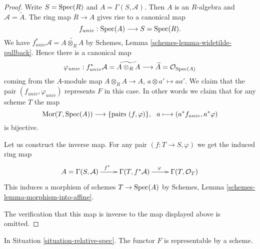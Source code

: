 \begin{proof}
Write $S = \mathop{\rm Spec}(R)$ and $A = \Gamma(S, \mathcal{A})$.
Then $A$ is an $R$-algebra and $\mathcal{A} = \widetilde A$.
The ring map $R \to A$ gives rise to a canonical map
$$
f_{univ} : \mathop{\rm Spec}(A)
\longrightarrow
S = \mathop{\rm Spec}(R).
$$
We have
$f_{univ}^*\mathcal{A} =  \widetilde{A \otimes_R A}$
by Schemes, Lemma \ref{schemes-lemma-widetilde-pullback}.
Hence there is a canonical map
$$
\varphi_{univ} :
f_{univ}^*\mathcal{A} = \widetilde{A \otimes_R A}
\longrightarrow
\widetilde A = \mathcal{O}_{\mathop{\rm Spec}(A)}
$$
coming from the $A$-module map $A \otimes_R A \to A$,
$a \otimes a' \mapsto aa'$. We claim that the pair
$(f_{univ}, \varphi_{univ})$ represents $F$ in this case.
In other words we claim that for any scheme $T$ the map
$$
\Mor(T, \Spec(A)) \longrightarrow
\{\text{pairs } (f, \varphi)\}, \ \ 
a \longmapsto (a^*f_{univ}, a^*\varphi)
$$
is bijective.

\medskip\noindent
Let us construct the inverse map.
For any pair $(f : T \to S, \varphi)$ we get the induced
ring map
$$
\xymatrix{
A = \Gamma(S, \mathcal{A}) \ar[r]^{f^*} &
\Gamma(T, f^*\mathcal{A}) \ar[r]^{\varphi} &
\Gamma(T, \mathcal{O}_T)
}
$$
This induces a morphism of schemes $T \to \mathop{\rm Spec}(A)$
by Schemes, Lemma \ref{schemes-lemma-morphism-into-affine}.

\medskip\noindent
The verification that this map is inverse to the map
displayed above is omitted.
\end{proof}

\begin{lemma}
\label{lemma-spec}
In Situation \ref{situation-relative-spec}.
The functor $F$ is representable by a scheme.
\end{lemma}

